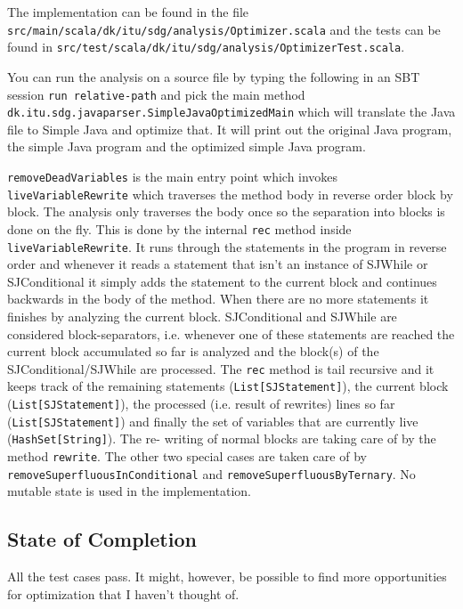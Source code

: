 \documentclass[11pt]{exam}
\begin{document}
The implementation can be found in the file
\texttt{src/main/scala/dk/itu/sdg/analysis/Optimizer.scala} and the tests
can be found in
\texttt{src/test/scala/dk/itu/sdg/analysis/OptimizerTest.scala}. \newline

You can run the analysis on a source file by typing the following in
an SBT session \texttt{run relative-path} and pick the main method
\texttt{dk.itu.sdg.javaparser.SimpleJavaOptimizedMain} which will
translate the Java file to Simple Java and optimize that. It will
print out the original Java program, the simple Java program and the
optimized simple Java program. \newline

\texttt{removeDeadVariables} is the main entry point which invokes
\texttt{liveVariableRewrite} which traverses the method body in
reverse order block by block. The analysis only traverses the body
once so the separation into blocks is done on the fly. This is done by
the internal \texttt{rec} method inside \texttt{liveVariableRewrite}.
It runs through the statements in the program in reverse order and
whenever it reads a statement that isn't  an instance of SJWhile or
SJConditional it simply adds the statement  to the current block and
continues backwards in the body of the method.  When there are no more
statements it finishes by analyzing the current  block. SJConditional
and SJWhile are considered block-separators, i.e. whenever one of
these statements are reached the current block accumulated so far is
analyzed and the block(s) of the SJConditional/SJWhile are processed.
The \texttt{rec} method is tail recursive and it keeps track of the
remaining statements (\texttt{List[SJStatement]}), the current block
(\texttt{List[SJStatement]}), the processed (i.e. result of rewrites)
lines so far (\texttt{List[SJStatement]}) and finally the set of
variables that are currently live (\texttt{HashSet[String]}). The re-
writing of normal blocks are taking care of by the method
\texttt{rewrite}. The  other two special cases are taken care of by
\texttt{removeSuperfluousInConditional}  and
\texttt{removeSuperfluousByTernary}. No mutable state is used in the implementation.


\subsection{State of Completion}

All the test cases pass. It might, however, be possible to find more
opportunities for optimization that I haven't thought of.
\end{document}
